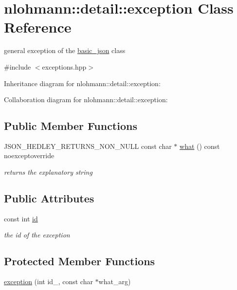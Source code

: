 \hypertarget{classnlohmann_1_1detail_1_1exception}{}\section{nlohmann\+:\+:detail\+:\+:exception Class Reference}
\label{classnlohmann_1_1detail_1_1exception}


general exception of the \hyperlink{classnlohmann_1_1basic__json}{basic\+\_\+json} class  




{\ttfamily \#include $<$exceptions.\+hpp$>$}



Inheritance diagram for nlohmann\+:\+:detail\+:\+:exception\+:


Collaboration diagram for nlohmann\+:\+:detail\+:\+:exception\+:
\subsection*{Public Member Functions}
\begin{DoxyCompactItemize}
\item 
J\+S\+O\+N\+\_\+\+H\+E\+D\+L\+E\+Y\+\_\+\+R\+E\+T\+U\+R\+N\+S\+\_\+\+N\+O\+N\+\_\+\+N\+U\+LL const char $\ast$ \hyperlink{classnlohmann_1_1detail_1_1exception_a60ab30cf1d348a6f559804564af0c0e5}{what} () const noexceptoverride
\begin{DoxyCompactList}\small\item\em returns the explanatory string \end{DoxyCompactList}\end{DoxyCompactItemize}
\subsection*{Public Attributes}
\begin{DoxyCompactItemize}
\item 
const int \hyperlink{classnlohmann_1_1detail_1_1exception_a0d4589a3fb54e81646d986c05efa3b9a}{id}
\begin{DoxyCompactList}\small\item\em the id of the exception \end{DoxyCompactList}\end{DoxyCompactItemize}
\subsection*{Protected Member Functions}
\begin{DoxyCompactItemize}
\item 
\hyperlink{classnlohmann_1_1detail_1_1exception_ae323ad0d53bc724414c2233164e65657}{exception} (int id\+\_\+, const char $\ast$what\+\_\+arg)
\end{DoxyCompactItemize}
